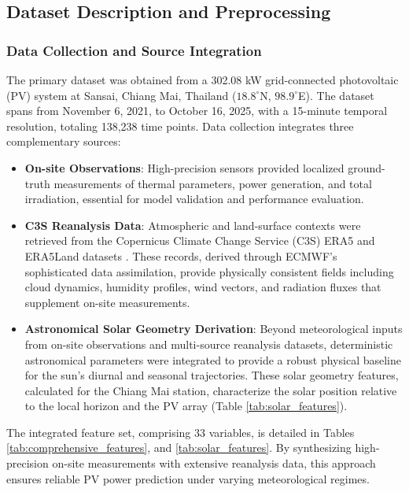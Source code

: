 \documentclass[conference]{IEEEtran}
\begin{document}
\subsection{Dataset Description and Preprocessing}

\subsubsection{\textbf{Data Collection and Source Integration}}
The primary dataset was obtained from a 302.08 kW grid-connected photovoltaic (PV) system at Sansai, Chiang Mai, Thailand ($18.8^\circ$N, $98.9^\circ$E). The dataset spans from November 6, 2021, to October 16, 2025, with a 15-minute temporal resolution, totaling 138,238 time points. Data collection integrates three complementary sources:

\begin{itemize} 
	\item \textbf{On-site Observations}: High-precision sensors provided localized ground-truth measurements of thermal parameters, power generation, and total irradiation, essential for model validation and performance evaluation. 
	\item \textbf{C3S Reanalysis Data}: Atmospheric and land-surface contexts were retrieved from the Copernicus Climate Change Service (C3S) ERA5 and ERA5Land datasets \cite{Copernicus2023, Hersbach2023, CopernicusLand2019, MunozSabater2019}. These records, derived through ECMWF's sophisticated data assimilation, provide physically consistent fields including cloud dynamics, humidity profiles, wind vectors, and radiation fluxes that supplement on-site measurements. 
	\item \textbf{Astronomical Solar Geometry Derivation}: Beyond meteorological inputs from on-site observations and multi-source reanalysis datasets, deterministic astronomical parameters were integrated to provide a robust physical baseline for the sun’s diurnal and seasonal trajectories. These solar geometry features, calculated for the Chiang Mai station, characterize the solar position relative to the local horizon and the PV array (Table \ref{tab:solar_features}).
\end{itemize}

The integrated feature set, comprising 33 variables, is detailed in Tables \ref{tab:comprehensive_features}, and \ref{tab:solar_features}. By synthesizing high-precision on-site measurements with extensive reanalysis data, this approach ensures reliable PV power prediction under varying meteorological regimes.
\end{document}
